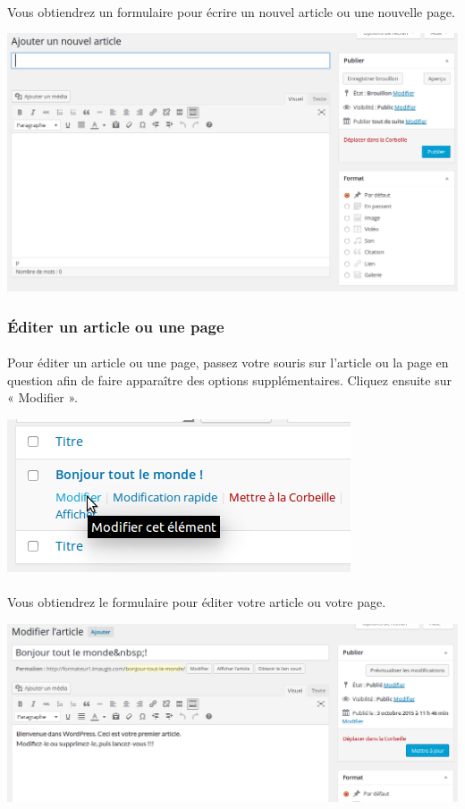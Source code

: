\documentclass[10pt,a4paper]{article}
\begin{document}
\paragraph{}Vous obtiendrez un formulaire pour écrire un nouvel article ou une nouvelle page.
\begin{center}
\includegraphics[scale=0.3]{img/0064.png}
\end{center}
\subsubsection{Éditer un article ou une page}
\paragraph{}Pour éditer un article ou une page, passez votre souris sur l'article ou la page en question afin de faire apparaître des options supplémentaires. Cliquez ensuite sur « Modifier ».
\begin{center}
\includegraphics[scale=0.35]{img/0066.png}
\end{center}
\paragraph{}Vous obtiendrez le formulaire pour éditer votre article ou votre page.
\begin{center}
\includegraphics[scale=0.35]{img/0067.png}
\end{center}
\end{document}
